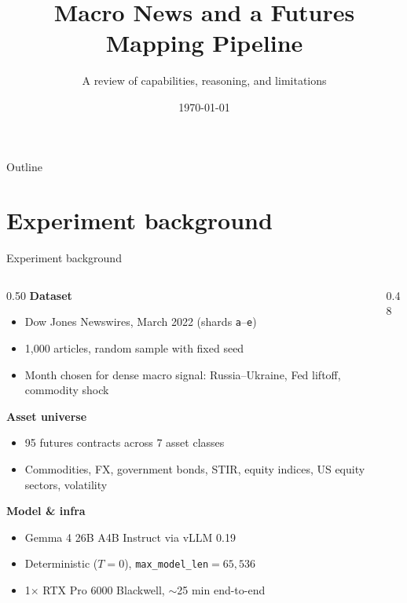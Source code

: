 \documentclass[10pt,aspectratio=169]{beamer}
\title{Macro News and a Futures Mapping Pipeline}
\subtitle{A review of capabilities, reasoning, and limitations}
\date{\today}
\begin{document}
\maketitle

\begin{frame}{Outline}
  \tableofcontents
\end{frame}

\section{Experiment background}

\begin{frame}{Experiment background}
  \scriptsize
  \begin{columns}[T,onlytextwidth]
    \begin{column}{0.50\textwidth}
      \textbf{Dataset}
      \begin{itemize}\itemsep0.1em
        \item Dow Jones Newswires, March 2022 (shards \texttt{a}--\texttt{e})
        \item 1{,}000 articles, random sample with fixed seed
        \item Month chosen for dense macro signal: Russia--Ukraine, Fed liftoff, commodity shock
      \end{itemize}
      \vspace{0.3em}
      \textbf{Asset universe}
      \begin{itemize}\itemsep0.1em
        \item 95 futures contracts across 7 asset classes
        \item Commodities, FX, government bonds, STIR, equity indices, US equity sectors, volatility
      \end{itemize}
      \vspace{0.3em}
      \textbf{Model \& infra}
      \begin{itemize}\itemsep0.1em
        \item Gemma 4 26B A4B Instruct via vLLM 0.19
        \item Deterministic ($T{=}0$), \texttt{max\_model\_len}${=}65{,}536$
        \item 1$\times$ RTX Pro 6000 Blackwell, $\sim$25 min end-to-end
      \end{itemize}
    \end{column}
    \begin{column}{0.48\textwidth}

\end{column}
\end{columns}
\end{frame}
\end{document}
